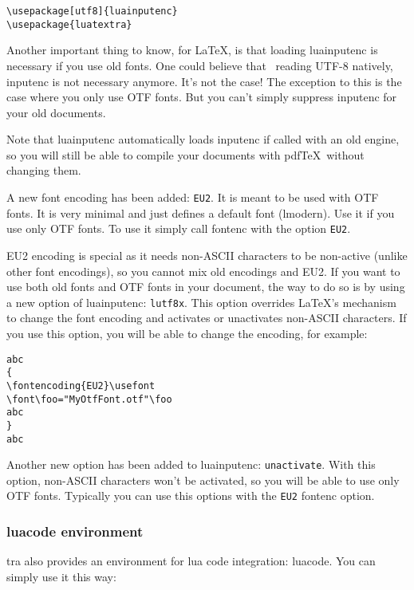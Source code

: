 \documentclass{article}
\begin{document}
\begin{verbatim}
\usepackage[utf8]{luainputenc}
\usepackage{luatextra}
\end{verbatim}

Another important thing to know, for \LaTeX , is that loading
\textsf{luainputenc} is necessary if you use old fonts. One could believe that
\LuaTeX\ reading UTF-8 natively, \textsf{inputenc} is not necessary anymore.
It's not the case! The exception to this is the case where you only use OTF
fonts. But you can't simply suppress \textsf{inputenc} for your old documents.

Note that \textsf{luainputenc} automatically loads \textsf{inputenc} if called
with an old engine, so you will still be able to compile your documents with
pdf\TeX\ without changing them.

A new font encoding has been added: \texttt{EU2}. It is meant to be used with
OTF fonts. It is very minimal and just defines a default font (lmodern). Use
it if you use only OTF fonts. To use it simply call \textsf{fontenc} with the
option \texttt{EU2}. 

EU2 encoding is special as it needs non-ASCII characters to be non-active
(unlike other font encodings), so you cannot mix old encodings and EU2. If you
want to use both old fonts and OTF fonts in your document, the way to do so is
by using a new option of \textsf{luainputenc}: \texttt{lutf8x}. This option
overrides \LaTeX 's mechanism to change the font encoding and activates or
unactivates non-ASCII characters. If you use this option, you will be able to
change the encoding, for example:

\begin{verbatim}
abc
{
\fontencoding{EU2}\usefont
\font\foo="MyOtfFont.otf"\foo
abc
}
abc
\end{verbatim} 

Another new option has been added to \textsf{luainputenc}:
\texttt{unactivate}. With this option, non-ASCII characters won't be
activated, so you will be able to use only OTF fonts. Typically you can use
this options with the \texttt{EU2} \textsf{fontenc} option.

\subsubsection{luacode environment}

\LuaTeX tra also provides an environment for lua code integration:
\textsf{luacode}. You can simply use it this way:
\end{document}
